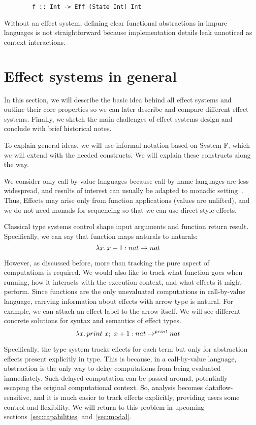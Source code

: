 \documentclass[conference]{IEEEtran}
\newcommand{\seq}{;~}
\newcommand{\ap}{~}
\begin{document}
    \begin{verbatim}
        f :: Int -> Eff (State Int) Int
    \end{verbatim}

    Without an effect system, defining clear functional abstractions in impure languages is not straightforward because implementation details leak unnoticed as context interactions.


    \section{Effect systems in general}

    In this section, we will describe the basic idea behind all effect systems and outline their core properties so we can later describe and compare different effect systems.
    Finally, we sketch the main challenges of effect systems design and conclude with brief historical notes.

    To explain general ideas, we will use informal notation based on System F, which we will extend with the needed constructs.
    We will explain these constructs along the way.

    We consider only call-by-value languages because call-by-name languages are less widespread, and results of interest can usually be adapted to monadic setting~\cite{wadler2003marriage}.
    Thus, Effects may arise only from function applications (values are unlifted), and we do not need monads for sequencing so that we can use direct-style effects.

    Classical type systems control shape input arguments and function return result.
    Specifically, we can say that function maps naturals to naturals:
    \[\lambda x\ldotp x + 1 : nat\to nat\]

    However, as discussed before, more than tracking the pure aspect of computations is required.
    We would also like to track what function goes when running, how it interacts with the execution context, and what effects it might perform.
    Since functions are the only unevaluated computations in call-by-value language, carrying information about effects with arrow type is natural.
    For example, we can attach an effect label to the arrow itself.
    We will see different concrete solutions for syntax and semantics of effect types.
    \[\lambda x\ldotp print \ap x\seq x + 1 : nat\to^{print} nat\]

    Specifically, the type system tracks effects for each term but only for abstraction effects present explicitly in type.
    This is because, in a call-by-value language, abstraction is the only way to delay computations from being evaluated immediately.
    Such delayed computation can be passed around, potentially escaping the original computational context.
    So, analysis becomes dataflow-sensitive, and it is much easier to track effects explicitly, providing users some control and flexibility.
    We will return to this problem in upcoming sections~\ref{sec:capabilities} and~\ref{sec:modal}.
\end{document}
